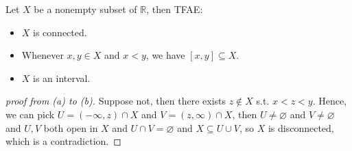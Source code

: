 \begin{theorem}
    Let \(X\) be a nonempty subset of \(\mathbb{R} \), then TFAE: 
    \begin{itemize}
        \item [(a)] \(X\) is connected.  
        \item [(b)] Whenever \(x, y \in X\) and \(x < y\), we have \([x, y] \subseteq X\).    
        \item [(c)] \(X\) is an interval. 
    \end{itemize}  
\end{theorem}
\begin{proof}[proof from (a) to (b)]   
    Suppose not, then there exists \(z \notin X\) s.t. \(x < z < y\). Hence, we can pick \(U = (-\infty , z) \cap X\) and \(V = (z, \infty ) \cap X\), then \(U \neq \varnothing \) and \(V \neq \varnothing \) and \(U, V\) both open in \(X\) and \(U \cap V = \varnothing \) and \(X \subseteq U \cup V\), so \(X\) is disconnected, which is a contradiction.           
\end{proof} 
